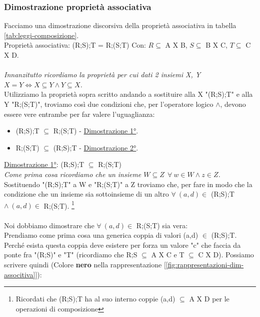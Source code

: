 \subsubsection{Dimostrazione proprietà associativa}
\begin{demostration}
    Facciamo una dimostrazione discorsiva della proprietà associativa in tabella \ref{tab:leggi-composizione}.\\
    Proprietà associativa: (R;S);T = R;(S;T) \hspace{.3cm} Con: $R \subseteq$ A X B, \: \: $S \subseteq$ B X C, \: \: $T \subseteq$ C X D.\\ \\
    \textit{Innanzitutto ricordiamo la proprietà per cui dati 2 insiemi X, Y $X = Y \Longleftrightarrow X \subseteq Y \land Y \subseteq X$.} \\
    Utilizziamo la proprietà sopra scritto andando a sostituire alla X "(R;S);T" e alla Y "R;(S;T)", troviamo così due condizioni che, per l'operatore logico $\land$, devono essere vere entrambe per far valere l'uguaglianza:
    \begin{itemize}
        \item (R;S);T $\subseteq$ R;(S;T) - \underline{Dimostrazione 1°}.
        \item R;(S;T) $\subseteq$ (R;S);T - \underline{Dimostrazione 2°}.
    \end{itemize}
        \underline{Dimostrazione 1°}: (R;S);T $\subseteq$ R;(S;T) \\ 
        \textit{Come prima cosa ricordiamo che un insieme $W \subseteq Z \: \: \forall \: w \in W \land z \in Z$.} \\
        Sostituendo "(R;S);T" a W e "R;(S;T)" a Z troviamo che, per fare in modo che la condizione che un insieme sia sottoinsieme di un altro $\forall \: (a,d) \in$ (R;S);T $ \land \: (a,d) \in$ R;(S;T). \footnote{Ricordati che (R;S);T ha al suo interno coppie (a,d) $\subseteq$ A X D per le operazioni di composizione}\\ \\
        Noi dobbiamo dimostrare che $\forall \: (a,d) \in$ R;(S;T) sia vera:\\
        Prendiamo come prima cosa una generica coppia di valori (a,d) $\in$ (R;S);T. Perché esista questa coppia deve esistere per forza un valore "c" che faccia da ponte fra "(R;S)" e "T" (ricordiamo che R;S $\subseteq$ A X C e T $\subseteq$ C X D). Possiamo scrivere quindi (Colore \textbf{nero} nella rappresentazione [\ref{fig:rappresentazioni-dim-associtiva}]):

\end{demostration}
